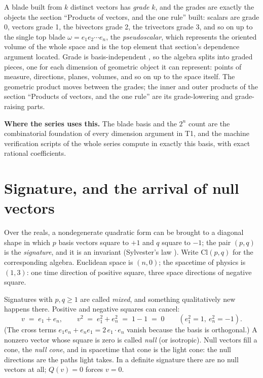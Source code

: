 \documentclass[11pt]{article}
\theoremstyle{definition}
\theoremstyle{plain}
\providecommand{\Cl}{}\renewcommand{\Cl}{\mathrm{Cl}}
\begin{document}
A blade built from $k$ distinct vectors has \emph{grade} $k$, and the grades are exactly the objects the section ``Products of vectors, and the one rule'' built: scalars are grade 0, vectors grade 1, the bivectors grade 2, the trivectors grade 3, and so on up to the single top blade $\omega = e_1 e_2 \cdots e_n$, the \emph{pseudoscalar}, which represents the oriented volume of the whole space and is the top element that section's dependence argument located. Grade is basis-independent \cite{Porteous1995}, so the algebra splits into graded pieces, one for each dimension of geometric object it can represent: points of measure, directions, planes, volumes, and so on up to the space itself. The geometric product moves between the grades; the inner and outer products of the section ``Products of vectors, and the one rule'' are its grade-lowering and grade-raising parts.

\label{c:note.primer.setting-blades-grades-2}
\textbf{Where the series uses this.} The blade basis and the $2^{n}$ count are the combinatorial foundation of every dimension argument in T1, and the machine verification scripts of the whole series compute in exactly this basis, with exact rational coefficients.

\section{Signature, and the arrival of null vectors}

\label{c:note.primer.setting-signature-arrival-null-vectors}
Over the reals, a nondegenerate quadratic form can be brought to a diagonal shape in which $p$ basis vectors square to $+1$ and $q$ square to $-1$; the pair $(p,q)$ is the \emph{signature}, and it is an invariant (Sylvester's law \cite{Lam2005}). Write $\Cl(p,q)$ for the corresponding algebra. Euclidean space is $(n, 0)$; the spacetime of physics is $(1,3)$: one time direction of positive square, three space directions of negative square.

Signatures with $p, q \geq 1$ are called \emph{mixed}, and something qualitatively new happens there. Positive and negative squares can cancel:
\[
v \;=\; e_1 + e_n, \qquad v^{2} \;=\; e_1^{2} + e_n^{2} \;=\; 1 - 1 \;=\; 0 \qquad (e_1^2 = 1,\ e_n^2 = -1).
\]
(The cross terms $e_1 e_n + e_n e_1 = 2\,e_1 \cdot e_n$ vanish because the basis is orthogonal.) A nonzero vector whose square is zero is called \emph{null} (or isotropic). Null vectors fill a cone, the \emph{null cone}, and in spacetime that cone is the light cone: the null directions are the paths light takes. In a definite signature there are no null vectors at all; $Q(v) = 0$ forces $v = 0$.
\end{document}
